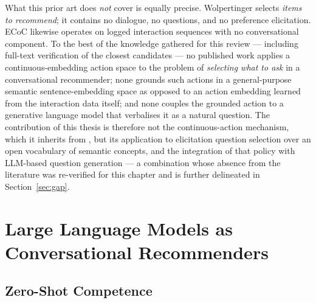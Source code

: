 What this prior art does \textit{not} cover is equally precise. Wolpertinger selects \textit{items to recommend}; it contains no dialogue, no questions, and no preference elicitation. ECoC likewise operates on logged interaction sequences with no conversational component. To the best of the knowledge gathered for this review — including full-text verification of the closest candidates — no published work applies a continuous-embedding action space to the problem of \textit{selecting what to ask} in a conversational recommender; none grounds such actions in a general-purpose semantic sentence-embedding space as opposed to an action embedding learned from the interaction data itself; and none couples the grounded action to a generative language model that verbalises it as a natural question. The contribution of this thesis is therefore not the continuous-action mechanism, which it inherits from \citet{dulacarnold2015deep}, but its application to elicitation question selection over an open vocabulary of semantic concepts, and the integration of that policy with LLM-based question generation — a combination whose absence from the literature was re-verified for this chapter and is further delineated in Section~\ref{sec:gap}.

\section{Large Language Models as Conversational Recommenders}
\label{sec:llm_crs}

\subsection{Zero-Shot Competence}

